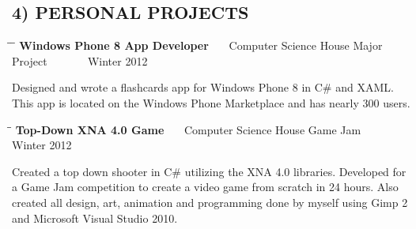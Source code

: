 \documentclass{res}
\begin{document}
\begin{resume}
\section{4) PERSONAL PROJECTS}
  \vspace{-5pt} 
   \begin{tabbing}%
   \hspace{2.3in}\= \hspace{2.6in}\= \kill %
   \vspace{-5pt}	
   \hspace{2.3in}\= \hspace{2.6in}\= \kill %
   {\bf Windows Phone 8 App Developer }  \>~~~Computer Science House Major Project \> ~~~~~~ Winter 2012\\
   \end{tabbing}\vspace{-30pt}
    Designed and wrote a flashcards app for Windows Phone 8 in C\# and XAML. This app is located
    on the Windows Phone Marketplace and has nearly 300 users. 
    \vspace{-5pt}
    \begin{tabbing}%
   \hspace{2.3in}\= \hspace{2.6in}\= \kill %
   {\bf Top-Down XNA 4.0 Game }  \>~~~Computer Science House Game Jam \> ~~~~~~ Winter 2012\\
   \end{tabbing}\vspace{-30pt}
    Created a top down shooter in C\# utilizing the XNA 4.0 libraries. 
    Developed for a Game Jam competition to create a video game from scratch in 24 hours. 
    Also created all design, art, animation and programming done by myself using Gimp 2 and Microsoft Visual Studio 2010.
    

\end{resume}
\end{document}
